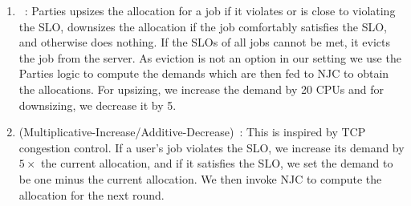 \begin{enumerate}[label=\arabic*)]
\item \parties~\citep{chen2019parties}: 
Parties upsizes the allocation for a job
if it violates or is close to violating the SLO, downsizes the allocation if the job comfortably
satisfies the SLO, and otherwise does nothing.
If the SLOs of all jobs cannot be met, it evicts the job from the server.
As eviction is not an option in our setting %
we use the Parties logic to compute the demands which are then fed to NJC to obtain the allocations.
For upsizing, we increase the demand by 20 CPUs and for downsizing, we decrease it by 5.

\item \AIMD{} (Multiplicative-Increase/Additive-Decrease)~\citep{chiu1989analysis}: 
This is inspired by TCP congestion control.
If a user's job violates the SLO, we increase its demand by $5\times$ the current allocation,
and if it satisfies the SLO, we set the demand to be one minus the current allocation.
We then invoke NJC to compute the allocation for the next round.
\end{enumerate}







